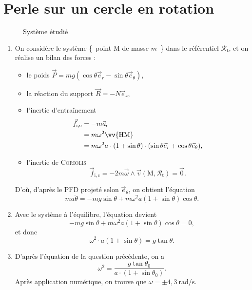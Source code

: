 \section{Perle sur un cercle en rotation}

\begin{figure}[H]
	\centering
	
	\caption{Système étudié}
\end{figure}

\begin{enumerate}
	\item On considère le système \{~point $\mathrm{M}$ de masse $m$~\} dans le référentiel $\mathcal{R}_\mathrm{t}$, et on réalise un bilan des forces :
		\begin{itemize}
			\item le poids $\vec{P} = m g (\cos \theta \vec{e}_r - \sin \theta \vec{e}_\theta)$,
			\item la réaction du support $\vec{R} = - N \vec{e}_r$,
			\item l'inertie d'entraînement
				\begin{align*}
					\vec{f}_\mathrm{i,e} &= - m \vec{a}_\mathrm{e}\\
					&= m \omega^2 \vv{\mathrm{HM}}\\
					&= m \omega^2 a \cdot (1 + \sin \theta) \cdot (\sin \theta \vec{e}_r + \cos \theta \vec{e}_\theta),			\\
				\end{align*}
			\item l'inertie de \textsc{Coriolis} \[
				\vec{f}_\mathrm{i,c} = -2 m \vec{\omega} \wedge \vec{v}(\mathrm{M}, \mathcal{R}_\mathrm{t}) = \vec{0}
			.\] 
		\end{itemize}
		D'où, d'après le PFD projeté selon $\vec{e}_\theta$, on obtient l'équation \[
			m a \ddot{\theta} = - m g \sin \theta + m \omega^2 a(1 + \sin \theta) \cos \theta
		.\]
	\item Avec le système à l'équilibre, l'équation devient \[
			-mg \sin \theta + m \omega^2 a (1 + \sin \theta) \cos \theta = 0
		,\] et donc \[
			\omega^2 \cdot a (1 + \sin \theta) = g \tan \theta
		.\]
	\item D'après l'équation de la question précédente, on a \[
			\omega^2 = \frac{g \tan \theta_0}{a \cdot (1 + \sin \theta_0)}
		.\] Après application numérique, on trouve que $\omega = \pm 4{,}3 \: \mathrm{rad / s}$.
\end{enumerate}
